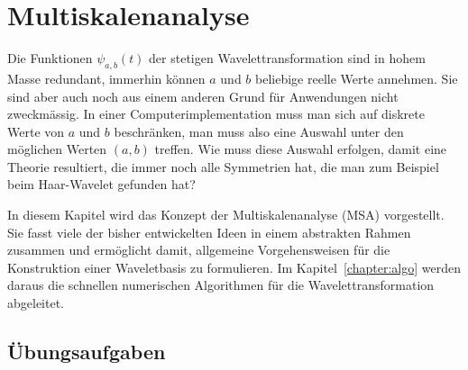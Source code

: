 %
%
%
\chapter{Multiskalenanalyse
\label{chapter:msa}}
Die Funktionen $\psi_{a,b}(t)$ der stetigen Wavelettransformation
sind in hohem Masse redundant, immerhin können $a$ und $b$ beliebige
reelle Werte annehmen.
Sie sind aber auch noch aus einem anderen Grund für Anwendungen
nicht zweckmässig.
In einer Computerimplementation muss man sich auf diskrete Werte 
von $a$ und $b$ beschränken, man muss also eine Auswahl unter den möglichen
Werten $(a,b)$ treffen.
Wie muss diese Auswahl erfolgen, damit eine Theorie resultiert, die
immer noch alle Symmetrien hat, die man zum Beispiel beim Haar-Wavelet
gefunden hat?

In diesem Kapitel wird das Konzept der Multiskalenanalyse (MSA) vorgestellt.
Sie fasst viele der bisher entwickelten Ideen in einem abstrakten
Rahmen zusammen und ermöglicht damit, allgemeine Vorgehensweisen für die
Konstruktion einer Waveletbasis zu formulieren.
Im Kapitel~\ref{chapter:algo} werden daraus die schnellen numerischen
Algorithmen für die Wavelettransformation abgeleitet.






\section*{Übungsaufgaben}


